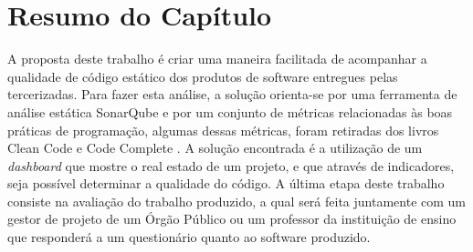 \section{Resumo do Capítulo}
A proposta deste trabalho é criar uma maneira facilitada de acompanhar a qualidade de código estático dos produtos de software entregues pelas tercerizadas. Para fazer esta análise, a solução orienta-se por uma ferramenta de análise estática SonarQube e por um conjunto de métricas relacionadas às boas práticas de programação, algumas dessas métricas, foram retiradas dos livros Clean Code \cite{martin2009clean} e Code Complete \cite{mcconnell2004code}. A solução encontrada é a utilização de um \textit{dashboard} que mostre o real estado de um projeto, e que através de indicadores, seja possível determinar a qualidade do código. A última etapa deste trabalho consiste na avaliação do trabalho produzido, a qual será feita juntamente com um gestor de projeto de um Órgão Público ou um professor da instituição de ensino que responderá a um questionário quanto ao software produzido.